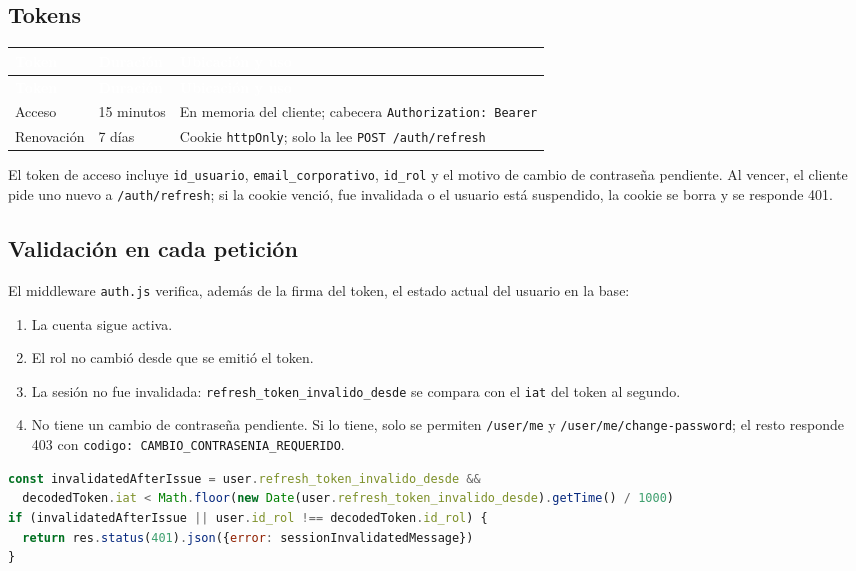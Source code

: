 \documentclass[11pt,letterpaper]{article}
\newcommand{\cabecera}{\rowcolor{maxamPrimario}}
\newcommand{\tth}[1]{\textcolor{white}{\textbf{#1}}}
\newcommand{\code}[1]{\nolinkurl{#1}}
\begin{document}
\subsection{Tokens}
\begin{xltabular}{\textwidth}{L{3.4cm} L{2.4cm} Y}
\cabecera \tth{Token} & \tth{Duración} & \tth{Ubicación y uso} \\
\endfirsthead
\cabecera \tth{Token} & \tth{Duración} & \tth{Ubicación y uso} \\
\endhead
{} Acceso & 15 minutos & En memoria del cliente; cabecera \code{Authorization: Bearer} \\
Renovación & 7 días & Cookie \code{httpOnly}; solo la lee \code{POST /auth/refresh} \\
\end{xltabular}

El token de acceso incluye \code{id_usuario}, \code{email_corporativo}, \code{id_rol} y el motivo de cambio de contraseña pendiente. Al vencer, el cliente pide uno nuevo a \code{/auth/refresh}; si la cookie venció, fue invalidada o el usuario está suspendido, la cookie se borra y se responde 401.

\subsection{Validación en cada petición}
El middleware \code{auth.js} verifica, además de la firma del token, el estado actual del usuario en la base:

\begin{enumerate}
  \item La cuenta sigue activa.
  \item El rol no cambió desde que se emitió el token.
  \item La sesión no fue invalidada: \code{refresh_token_invalido_desde} se compara con el \code{iat} del token al segundo.
  \item No tiene un cambio de contraseña pendiente. Si lo tiene, solo se permiten \code{/user/me} y \code{/user/me/change-password}; el resto responde 403 con \code{codigo: CAMBIO_CONTRASENIA_REQUERIDO}.
\end{enumerate}

\begin{lstlisting}[language=JavaScript]
const invalidatedAfterIssue = user.refresh_token_invalido_desde &&
  decodedToken.iat < Math.floor(new Date(user.refresh_token_invalido_desde).getTime() / 1000)
if (invalidatedAfterIssue || user.id_rol !== decodedToken.id_rol) {
  return res.status(401).json({error: sessionInvalidatedMessage})
}
\end{lstlisting}
\end{document}
